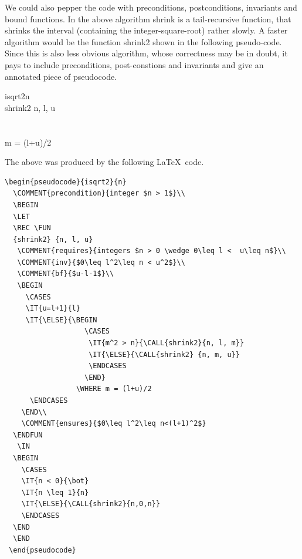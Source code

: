 \documentclass[a4]{article}
\begin{document}
We could also pepper the code with preconditions, postconditions, invariants and
bound functions. In the above algorithm {\sc shrink} is a tail-recursive
function, that shrinks the interval (containing the integer-square-root) rather
slowly. A faster algorithm would be the function {\sc shrink2} shown in the
following pseudo-code. Since this is also less obvious algorithm, whose
correctness may be in doubt, it pays to include preconditions, post-constions and
invariants and give an annotated piece of pseudocode.

\begin{pseudocode}{isqrt2}{n}
  \\
  \BEGIN
  \LET 
  \REC \FUN
  {shrink2} {n, l, u}
   \\
   \\
   \\
   \BEGIN
     \CASES
                 \WHERE m = (l+u)/2
      \ENDCASES
    \END\\
  \ENDFUN
   \IN
  \BEGIN
    \CASES
    \ENDCASES
  \END
  \END
 \end{pseudocode}  

The above was produced by the following \LaTeX\ code.

\begin{verbatim}
\begin{pseudocode}{isqrt2}{n}
  \COMMENT{precondition}{integer $n > 1$}\\
  \BEGIN
  \LET 
  \REC \FUN
  {shrink2} {n, l, u}
   \COMMENT{requires}{integers $n > 0 \wedge 0\leq l <  u\leq n$}\\
   \COMMENT{inv}{$0\leq l^2\leq n < u^2$}\\
   \COMMENT{bf}{$u-l-1$}\\
   \BEGIN
     \CASES
     \IT{u=l+1}{l}
     \IT{\ELSE}{\BEGIN
                   \CASES
                    \IT{m^2 > n}{\CALL{shrink2}{n, l, m}}
                    \IT{\ELSE}{\CALL{shrink2} {n, m, u}}
                    \ENDCASES
                   \END}
                 \WHERE m = (l+u)/2
      \ENDCASES
    \END\\
    \COMMENT{ensures}{$0\leq l^2\leq n<(l+1)^2$}
  \ENDFUN
   \IN
  \BEGIN
    \CASES
    \IT{n < 0}{\bot}
    \IT{n \leq 1}{n}
    \IT{\ELSE}{\CALL{shrink2}{n,0,n}}
    \ENDCASES
  \END
  \END
 \end{pseudocode}  
\end{verbatim}
\end{document}
